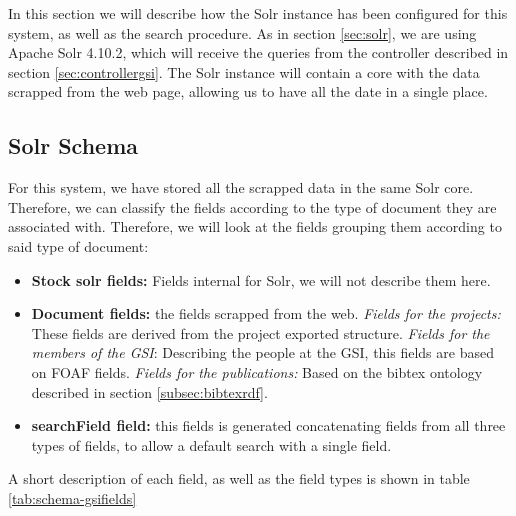 In this section we will describe how the Solr instance has been configured for this system, as well as the search procedure. As in section \ref{sec:solr}, we are using Apache Solr 4.10.2, which will receive the queries from the controller described in section \ref{sec:controllergsi}. The Solr instance will contain a core with the data scrapped from the web page, allowing us to have all the date in a single place. %

\subsection{Solr Schema}

For this system, we have stored all the scrapped data in the same Solr core. Therefore, we can classify the fields according to the type of document they are associated with. Therefore, we will look at the fields grouping them according to said type of document:

\begin{itemize}
 \item \textbf{Stock solr fields:} Fields internal for Solr, we will not describe them here.
 \item \textbf{Document fields:} the fields scrapped from the web.
    \subitem \emph{Fields for the projects:} These fields are derived from the project exported structure.
    \subitem \emph{Fields for the members of the GSI}: Describing the people at the GSI, this fields are based on \ac{FOAF} fields.
    \subitem \emph{Fields for the publications:} Based on the bibtex ontology described in section \ref{subsec:bibtexrdf}.
 \item \textbf{searchField field:} this fields is generated concatenating fields from all three types of fields, to allow a default search with a single field.
\end{itemize}

A short description of each field, as well as the field types is shown in table \ref{tab:schema-gsifields}

